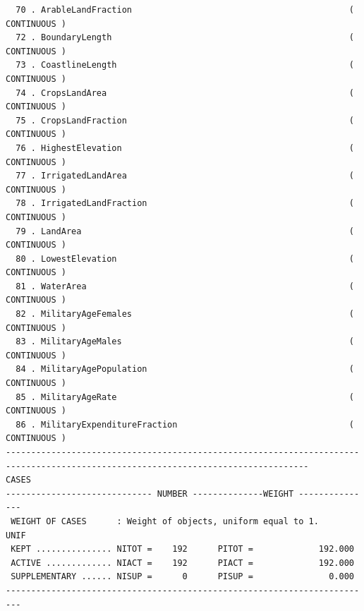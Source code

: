 \documentclass[a4paper,10pt,twocolumn]{article}
\begin{document}
\begin{landscape}
\begin{verbatim}
  70 . ArableLandFraction                                           ( CONTINUOUS )
  72 . BoundaryLength                                               ( CONTINUOUS )
  73 . CoastlineLength                                              ( CONTINUOUS )
  74 . CropsLandArea                                                ( CONTINUOUS )
  75 . CropsLandFraction                                            ( CONTINUOUS )
  76 . HighestElevation                                             ( CONTINUOUS )
  77 . IrrigatedLandArea                                            ( CONTINUOUS )
  78 . IrrigatedLandFraction                                        ( CONTINUOUS )
  79 . LandArea                                                     ( CONTINUOUS )
  80 . LowestElevation                                              ( CONTINUOUS )
  81 . WaterArea                                                    ( CONTINUOUS )
  82 . MilitaryAgeFemales                                           ( CONTINUOUS )
  83 . MilitaryAgeMales                                             ( CONTINUOUS )
  84 . MilitaryAgePopulation                                        ( CONTINUOUS )
  85 . MilitaryAgeRate                                              ( CONTINUOUS )
  86 . MilitaryExpenditureFraction                                  ( CONTINUOUS )
----------------------------------------------------------------------------------------------------------------------------------
CASES
----------------------------- NUMBER --------------WEIGHT ---------------
 WEIGHT OF CASES      : Weight of objects, uniform equal to 1.                  UNIF
 KEPT ............... NITOT =    192      PITOT =             192.000
 ACTIVE ............. NIACT =    192      PIACT =             192.000
 SUPPLEMENTARY ...... NISUP =      0      PISUP =               0.000
-------------------------------------------------------------------------


\end{verbatim}
\end{landscape}
\end{document}
